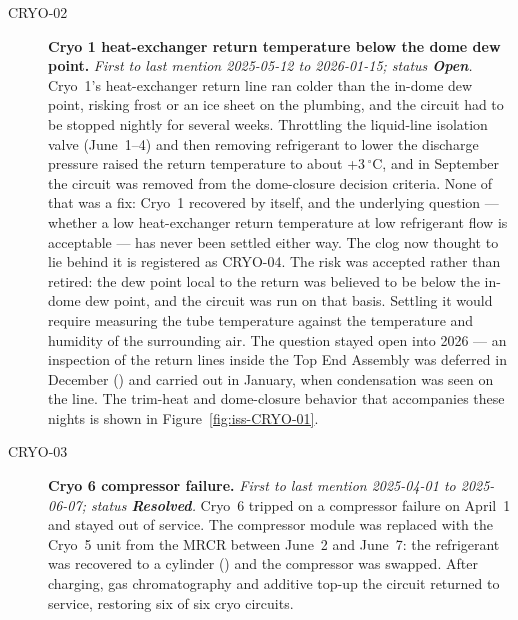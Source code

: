 \begin{description}
\item[CRYO-02]\label{iss:CRYO-02} \textbf{Cryo 1 heat-exchanger return temperature below the dome dew point.}
  \emph{First to last mention 2025-05-12 to 2026-01-15; status \textcolor{stopn}{\textbf{Open}}.}
  Cryo~1's heat-exchanger return line ran colder than the in-dome dew point, risking frost or an ice sheet on the plumbing, and the circuit had to be stopped nightly for several weeks.  Throttling the liquid-line isolation valve (June~1--4) and then removing refrigerant to lower the discharge pressure raised the return temperature to about +3\,$^{\circ}$C, and in September the circuit was removed from the dome-closure decision criteria.  None of that was a fix: Cryo~1 recovered by itself, and the underlying question --- whether a low heat-exchanger return temperature at low refrigerant flow is acceptable --- has never been settled either way.  The clog now thought to lie behind it is registered as CRYO-04.  The risk was accepted rather than retired: the dew point local to the return was believed to be below the in-dome dew point, and the circuit was run on that basis.  Settling it would require measuring the tube temperature against the temperature and humidity of the surrounding air.  The question stayed open into 2026 --- an inspection of the return lines inside the Top End Assembly was deferred in December () and carried out in January, when condensation was seen on the line. The trim-heat and dome-closure behavior that accompanies these nights is shown in Figure~\ref{fig:iss-CRYO-01}.

\item[CRYO-03]\label{iss:CRYO-03} \textbf{Cryo 6 compressor failure.}
  \emph{First to last mention 2025-04-01 to 2025-06-07; status \textcolor{stres}{\textbf{Resolved}}.}
  Cryo~6 tripped on a compressor failure on April~1 and stayed out of service.  The compressor module was replaced with the Cryo~5 unit from the MRCR between June~2 and June~7: the refrigerant was recovered to a cylinder () and the compressor was swapped.  After charging, gas chromatography and additive top-up the circuit returned to service, restoring six of six cryo circuits.


\end{description}
